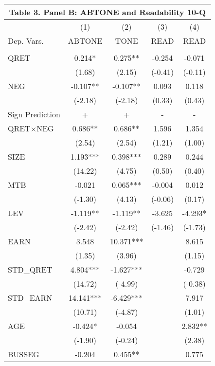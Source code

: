 \begin{table}[htbp] \label{T3PB}
  \centering
    \begin{tabular}{lcccc}
    \multicolumn{5}{c}{\textbf{Table 3. Panel B: ABTONE and Readability 10-Q}} \\
    \midrule
    \midrule
      & (1) & (2) & (3) & (4) \\
    Dep. Vars. & ABTONE & TONE & READ & READ \\
    \midrule
      &   &   &   &  \\
    QRET & 0.214* & 0.275** & -0.254 & -0.071 \\
      & (1.68) & (2.15) & (-0.41) & (-0.11) \\
    NEG & -0.107** & -0.107** & 0.093 & 0.118 \\
      & (-2.18) & (-2.18) & (0.33) & (0.43) \\
    \rowcolor[rgb]{ .933,  .925,  .882} Sign Prediction & + & + & - & - \\
    \rowcolor[rgb]{ .933,  .925,  .882} QRET$\times$NEG & 0.686** & 0.686** & 1.596 & 1.354 \\
    \rowcolor[rgb]{ .933,  .925,  .882}   & (2.54) & (2.54) & (1.21) & (1.00) \\
    SIZE & 1.193*** & 0.398*** & 0.289 & 0.244 \\
      & (14.22) & (4.75) & (0.50) & (0.40) \\
    MTB & -0.021 & 0.065*** & -0.004 & 0.012 \\
      & (-1.30) & (4.13) & (-0.06) & (0.17) \\
    LEV & -1.119** & -1.119** & -3.625 & -4.293* \\
      & (-2.42) & (-2.42) & (-1.46) & (-1.73) \\
    EARN & 3.548 & 10.371*** &   & 8.615 \\
      & (1.35) & (3.96) &   & (1.15) \\
    STD\_QRET & 4.804*** & -1.627*** &   & -0.729 \\
      & (14.72) & (-4.99) &   & (-0.38) \\
    STD\_EARN & 14.141*** & -6.429*** &   & 7.917 \\
      & (10.71) & (-4.87) &   & (1.01) \\
    AGE & -0.424* & -0.054 &   & 2.832** \\
      & (-1.90) & (-0.24) &   & (2.38) \\
    BUSSEG & -0.204 & 0.455** &   & 0.775 \\

\end{tabular}
\end{table}
